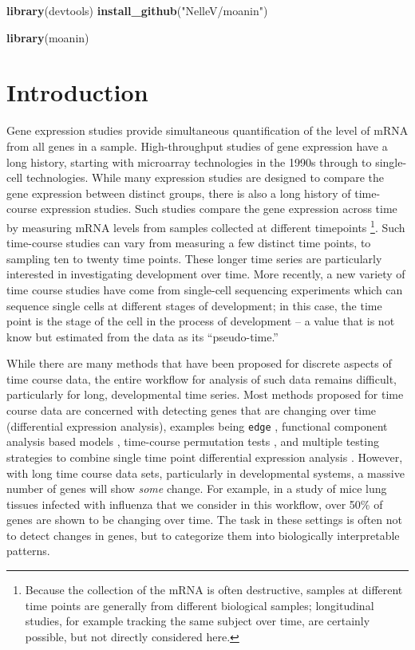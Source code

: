 \documentclass[9pt,a4paper,]{extarticle}
\newenvironment{Shaded}{\begin{snugshade}}{\end{snugshade}}
\newcommand{\KeywordTok}[1]{\textcolor[rgb]{0.13,0.29,0.53}{\textbf{#1}}}
\newcommand{\NormalTok}[1]{#1}
\newcommand{\StringTok}[1]{\textcolor[rgb]{0.31,0.60,0.02}{#1}}
\begin{document}
\begin{Shaded}
\begin{Highlighting}[]
\KeywordTok{library}\NormalTok{(devtools)}
\KeywordTok{install_github}\NormalTok{(}\StringTok{"NelleV/moanin"}\NormalTok{)}

\KeywordTok{library}\NormalTok{(moanin)}
\end{Highlighting}
\end{Shaded}

\hypertarget{introduction}{%
\section{Introduction}\label{introduction}}

Gene expression studies provide simultaneous quantification of the level of
mRNA from all genes in a sample. High-throughput studies of gene expression
have a long history, starting with microarray technologies in the 1990s
through to single-cell technologies. While many expression studies are
designed to compare the gene expression between distinct groups, there is also a
long history of time-course expression studies. Such studies compare the
gene expression
across time by measuring mRNA levels from samples collected at different
timepoints \footnote{Because the collection of the mRNA is often destructive, samples at
  different time points are generally from different biological samples;
  longitudinal studies, for example tracking the same subject over time, are
  certainly possible, but not directly considered here.}. Such time-course studies can vary from measuring a few
distinct time
points, to sampling ten to twenty time points. These longer time series are
particularly interested in investigating development over time. More recently,
a new variety of time course studies have come from single-cell sequencing experiments
\citep{shalek:single-cell, habib:div-seq, trapnell:dynamics}
which can sequence single cells at different stages of development; in this case,
the time point is the stage of the cell in the process of development -- a
value that is not know but estimated from the data as its ``pseudo-time.''

While there are many methods that have been proposed for discrete aspects of
time course data, the entire workflow for analysis of such data remains
difficult, particularly for long, developmental time series. Most methods
proposed for time course data are concerned with detecting genes that are
changing over time (differential expression analysis), examples being \texttt{edge}
\citep{storey:significance}, functional component analysis based models \citep{wu:more},
time-course permutation tests \citep{park:statistical}, and multiple testing
strategies to combine single time point differential expression analysis
\citep{sun:multiple}. However, with long time course data sets, particularly in
developmental systems, a massive number of genes will show \emph{some} change. For
example, in a study of mice lung tissues infected with influenza that we
consider in this workflow, over 50\% of genes
are shown to be changing over time. The task in these settings is often not to
detect changes in genes, but to categorize them into biologically interpretable
patterns.
\end{document}
